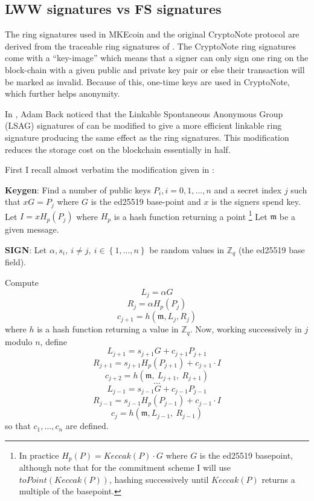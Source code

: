 \documentclass[12pt,oneside,english]{amsart}
\numberwithin{equation}{section}
\numberwithin{figure}{section}
\theoremstyle{plain}
\theoremstyle{plain}
\theoremstyle{remark}
\theoremstyle{plain}
\theoremstyle{remark}
\theoremstyle{remark}
\theoremstyle{plain}
\theoremstyle{definition}
\begin{document}
\subsection{\label{sub:BackLSAG}LWW signatures vs FS signatures}

The ring signatures used in MKEcoin and the original CryptoNote protocol are
derived from the traceable ring signatures of \cite{FS}. The CryptoNote \cite{CN}
ring signatures come with a ``key-image'' which means that a signer
can only sign one ring on the block-chain with a given public and
private key pair or else their transaction will be marked as invalid. Because of this, one-time keys are used in CryptoNote,
which further helps anonymity. 

In \cite{B}, Adam Back noticed that the Linkable Spontaneous Anonymous
Group (LSAG) signatures of \cite{LWW} can be modified to give a more efficient
linkable ring signature producing the same effect as the \cite{FS}
ring signatures. This modification reduces the storage cost on the
blockchain essentially in half.

First I recall almost verbatim the modification given in \cite{B}: 

\textbf{Keygen}: Find a number of public keys $P_{i},i=0,1,...,n$
and a secret index $j$ such that $xG=P_{j}$ where $G$ is the ed25519
base-point and $x$ is the signers spend key. Let $I=xH_p\left(P_{j}\right)$
where $H_p$ is a hash function returning a point \footnote{In practice $H_p(P) = Keccak(P)\cdot G$ where $G$ is the ed25519 basepoint, although note that for the commitment scheme I will use $toPoint(Keccak(P))$, hashing successively until $Keccak(P)$ returns a multiple of the basepoint.}
Let $\mathfrak{m}$ be a given message. 

\textbf{SIGN}: Let $\alpha,s_{i},\ i\neq j,\ i\in\left\{ 1,...,n\right\} $
be random values in $\mathbb{Z}_{q}$ (the ed25519 base field). 

Compute
\[
L_{j}=\alpha G
\]
\[
R_{j}=\alpha H_p\left(P_{j}\right)
\]
\[
c_{j+1}=h\left(\mathfrak{m},L_{j},R_{j}\right)
\]
 where $h$ is a hash function returning a value in $\mathbb{Z}_{q}$.
Now, working successively in $j$ modulo $n$, define 
\[
L_{j+1}=s_{j+1}G+c_{j+1}P_{j+1}
\]
\[
R_{j+1}=s_{j+1}H_p\left(P_{j+1}\right)+c_{j+1}\cdot I
\]
\[
c_{j+2}=h\left(\mathfrak{m},\ L_{j+1},\ R_{j+1}\right)
\]
\[
\cdots
\]
\[
L_{j-1}=s_{j-1}G+c_{j-1}P_{j-1}
\]
\[
R_{j-1}=s_{j-1}H_p\left(P_{j-1}\right)+c_{j-1}\cdot I
\]
\[
c_{j}=h\left(\mathfrak{m},L_{j-1},\ R_{j-1}\right)
\]
 so that $c_{1},...,c_{n}$ are defined. 
\end{document}
